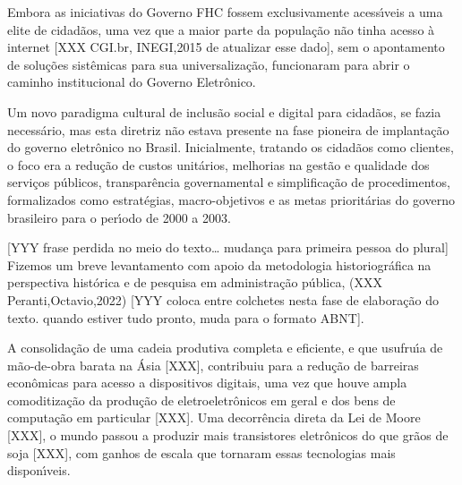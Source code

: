 \documentclass[
12pt,		%
openright,	%
twoside,  %
a4paper,			%
chapter=TITLE,		%
english,			%
french,				%
spanish,			%
brazil				%
]{USPSC-classe/USPSC_RedarTex}
\begin{document}
Embora as iniciativas do Governo FHC fossem exclusivamente acess\'{\i}veis a uma elite de cidad\~aos, uma vez que a maior parte da popula\c{c}\~ao n\~ao tinha acesso \`a internet [XXX CGI.br, INEGI,2015 de atualizar esse dado], sem o apontamento de solu\c{c}\~oes sist\^emicas para sua universaliza\c{c}\~ao, funcionaram para abrir o caminho institucional do Governo Eletr\^onico.










Um novo paradigma cultural de inclus\~ao social e digital para cidad\~aos, se fazia necess\'ario, mas esta diretriz n\~ao estava presente na fase pioneira de implanta\c{c}\~ao do governo eletr\^onico no Brasil. Inicialmente, tratando os cidad\~aos como clientes, o foco era a redu\c{c}\~ao de custos unit\'arios, melhorias na gest\~ao e qualidade dos servi\c{c}os p\'ublicos, transpar\^encia governamental e simplifica\c{c}\~ao de procedimentos, formalizados como estrat\'egias, macro-objetivos e  as metas priorit\'arias  do governo brasileiro para o per\'{\i}odo de 2000 a 2003.










[YYY frase perdida no meio do texto… mudan\c{c}a para primeira pessoa do plural] Fizemos um breve levantamento com apoio da metodologia historiogr\'afica na  perspectiva hist\'orica e de pesquisa em administra\c{c}\~ao p\'ublica, (XXX Peranti,Octavio,2022) [YYY coloca entre colchetes nesta fase de elabora\c{c}\~ao do texto. quando estiver tudo pronto, muda para o formato ABNT].










A consolida\c{c}\~ao de uma cadeia produtiva completa e eficiente, e que usufru\'{\i}a de m\~ao-de-obra barata na \'Asia [XXX], contribuiu para a redu\c{c}\~ao de barreiras econ\^omicas para acesso a dispositivos digitais, uma vez que houve ampla comoditiza\c{c}\~ao da produ\c{c}\~ao de eletroeletr\^onicos em geral e dos bens de computa\c{c}\~ao em particular [XXX]. Uma decorr\^encia direta da Lei de Moore [XXX], o mundo passou a produzir mais transistores eletr\^onicos do que gr\~aos de soja [XXX], com ganhos de escala que tornaram essas tecnologias mais dispon\'{\i}veis.
\end{document}
